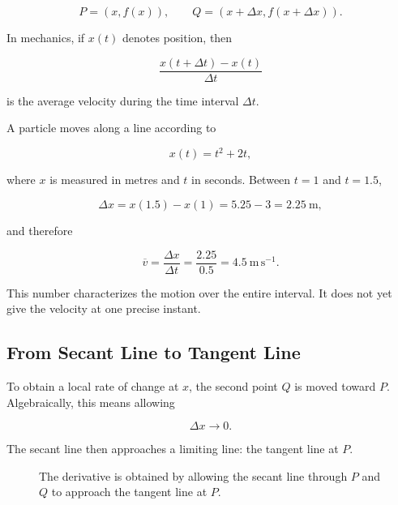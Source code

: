 \[
P=(x,f(x)),
\qquad
Q=(x+\Delta x,f(x+\Delta x)).
\]

In mechanics, if $x(t)$ denotes position, then

\[
\frac{x(t+\Delta t)-x(t)}{\Delta t}
\]

is the average velocity during the time interval $\Delta t$.

\begin{bookexample}
A particle moves along a line according to

\[
x(t)=t^2+2t,
\]

where $x$ is measured in metres and $t$ in seconds. Between $t=1$ and $t=1.5$,

\[
\Delta x=x(1.5)-x(1)
=5.25-3
=2.25\ \mathrm{m},
\]

and therefore

\[
\overline v
=
\frac{\Delta x}{\Delta t}
=
\frac{2.25}{0.5}
=4.5\ \mathrm{m\,s^{-1}}.
\]

This number characterizes the motion over the entire interval. It does not yet give the velocity at one precise instant.
\end{bookexample}

\subsection{From Secant Line to Tangent Line}

To obtain a local rate of change at $x$, the second point $Q$ is moved toward $P$. Algebraically, this means allowing

\[
\Delta x\to0.
\]

The secant line then approaches a limiting line: the tangent line at $P$.

\begin{figure}[htbp]
\centering
{}
\caption{The derivative is obtained by allowing the secant line through $P$ and $Q$ to approach the tangent line at $P$.}
\label{fig:secant-to-tangent}
\end{figure}

